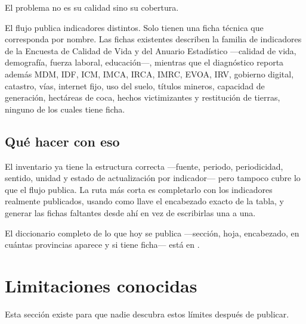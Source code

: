 \documentclass[11pt,a4paper]{article}
\begin{document}
El problema no es su calidad sino su cobertura.

\begin{hallazgo}[title={Las fichas describen otro sistema de indicadores}]
El flujo publica \cifraIndicadores{} indicadores distintos. Solo
\cifraConFicha{} tienen una ficha técnica que corresponda por nombre. Las fichas
existentes describen la familia de indicadores de la Encuesta de Calidad de Vida
y del Anuario Estadístico —calidad de vida, demografía, fuerza laboral,
educación—, mientras que el diagnóstico reporta además MDM, IDF, ICM, IMCA,
IRCA, IMRC, EVOA, IRV, gobierno digital, catastro, vías, internet fijo, uso del
suelo, títulos mineros, capacidad de generación, hectáreas de coca, hechos
victimizantes y restitución de tierras, ninguno de los cuales tiene ficha.
\end{hallazgo}

\begin{table}[htbp]\centering
\caption{Cobertura documental de los indicadores publicados}
\small

\end{table}

\subsection{Qué hacer con eso}

El inventario  ya tiene la estructura
correcta —fuente, periodo, periodicidad, sentido, unidad y estado de
actualización por indicador— pero tampoco cubre lo que el flujo publica. La ruta
más corta es completarlo con los indicadores realmente publicados, usando como
llave el encabezado exacto de la tabla, y generar las fichas faltantes desde ahí
en vez de escribirlas una a una.

El diccionario completo de lo que hoy se publica —sección, hoja, encabezado, en
cuántas provincias aparece y si tiene ficha— está en
.

\section{Limitaciones conocidas}
\label{sec:limitaciones}

Esta sección existe para que nadie descubra estos límites después de publicar.
\end{document}
